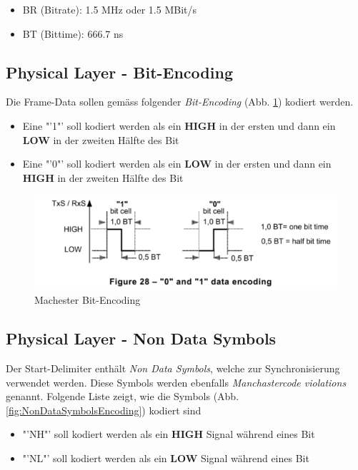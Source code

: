 \begin{itemize}
  \item BR (Bitrate): 1.5 MHz oder 1.5 MBit/s
  \item BT (Bittime): 666.7 ns
\end{itemize}

\subsection{Physical Layer - Bit-Encoding}
\label{sub:BitEncoding}
Die Frame-Data sollen gemäss folgender \textit{Bit-Encoding} (Abb. \ref{fig:manchester_Bit_Encoding}) kodiert werden.

\begin{itemize}
    \item Eine "'1"' soll kodiert werden als ein \textbf{HIGH} in der ersten und dann ein \textbf{LOW} in der zweiten Hälfte des Bit
    \item Eine "'0"' soll kodiert werden als ein \textbf{LOW} in der ersten und dann ein \textbf{HIGH} in der zweiten Hälfte des Bit
\end{itemize}

\begin{figure}[H]
    \centering
    \includegraphics[width = 0.7 \textwidth]{Figures/Chap2/Grundlagen/MVB_DOKU/Layer/Bit_Encoding.png}
    \caption{Machester Bit-Encoding}
    \label{fig:manchester_Bit_Encoding}
\end{figure}

\subsection{Physical Layer - Non Data Symbols} 
\label{sub:NonDataSymbols}
Der Start-Delimiter enthält \textit{Non Data Symbols}, welche zur Synchronisierung verwendet werden. Diese Symbols werden ebenfalls \textit{Manchastercode violations} genannt. Folgende Liste zeigt, wie die Symbols (Abb. \ref{fig:NonDataSymbolsEncoding}) kodiert sind

\begin{itemize}
    \item "'NH"' soll kodiert werden als ein \textbf{HIGH} Signal während eines Bit 
    \item "'NL"' soll kodiert werden als ein \textbf{LOW} Signal während eines Bit
\end{itemize}

